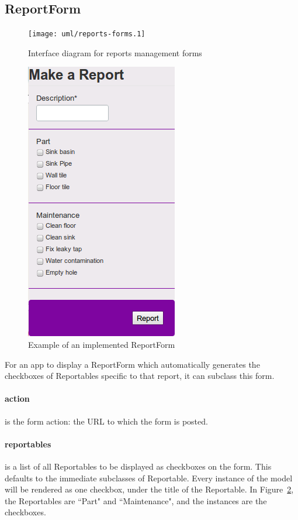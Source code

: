 \subsection{ReportForm}
\label{sec:rm:reportform}

\begin{figure}
\centering
\texttt{[image: uml/reports-forms.1]}
\caption{Interface diagram for reports management forms}
\label{fig:rm:forms}
\end{figure}

\begin{figure}
\centering
\includegraphics[scale=0.4]{img/reportform.png}
\caption{Example of an implemented ReportForm}
\label{fig:rm:reportform}
\end{figure}

For an app to display a ReportForm which automatically generates the checkboxes of Reportables specific to that report, it can subclass this form.

\paragraph{action} is the form action: the URL to which the form is posted.

\paragraph{reportables} is a list of all Reportables to be displayed as checkboxes on the form. This defaults to the immediate subclasses of Reportable. Every instance of the model will be rendered as one checkbox, under the title of the Reportable. In Figure~\ref{fig:rm:reportform}, the Reportables are ``Part" and ``Maintenance", and the instances are the checkboxes.

